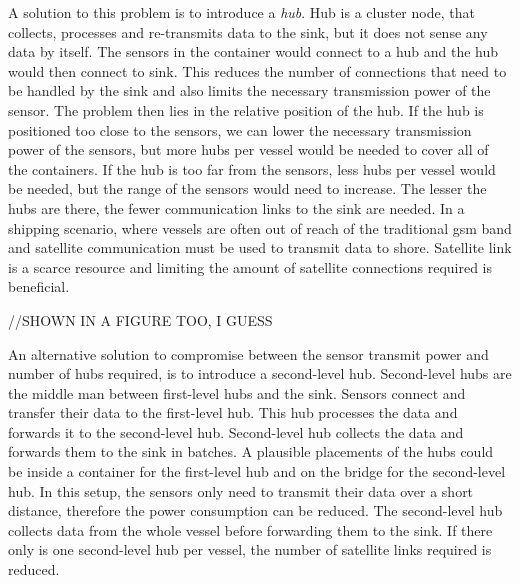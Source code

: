 A solution to this problem is to introduce a \textit{hub}. Hub is a cluster node, that collects, processes and re-transmits data to the sink, but it does not sense any data by itself. The sensors in the container would connect to a hub and the hub would then connect to sink. This reduces the number of connections that need to be handled by the sink and also limits the necessary transmission power of the sensor. The problem then lies in the relative position of the hub. If the hub is positioned too close to the sensors, we can lower the necessary transmission power of the sensors, but more hubs per vessel would be needed to cover all of the containers. If the hub is too far from the sensors, less hubs per vessel would be needed, but the range of the sensors would need to increase. The lesser the hubs are there, the fewer communication links to the sink are needed. In a shipping scenario, where vessels are often out of reach of the traditional \acrshort{gsm} band and satellite communication must be used to transmit data to shore. Satellite link is a scarce resource and limiting the amount of satellite connections required is beneficial.

//SHOWN IN A FIGURE TOO, I GUESS

An alternative solution to compromise between the sensor transmit power and number of hubs required, is to introduce a second-level hub. Second-level hubs are the middle man between first-level hubs and the sink. Sensors connect and transfer their data to the first-level hub. This hub processes the data and forwards it to the second-level hub. Second-level hub collects the data and forwards them to the sink in batches. A plausible placements of the hubs could be inside a container for the first-level hub and on the bridge for the second-level hub. In this setup, the sensors only need to transmit their data over a short distance, therefore the power consumption can be reduced. The second-level hub collects data from the whole vessel before forwarding them to the sink. If there only is one second-level hub per vessel, the number of satellite links required is reduced.
%
% 
